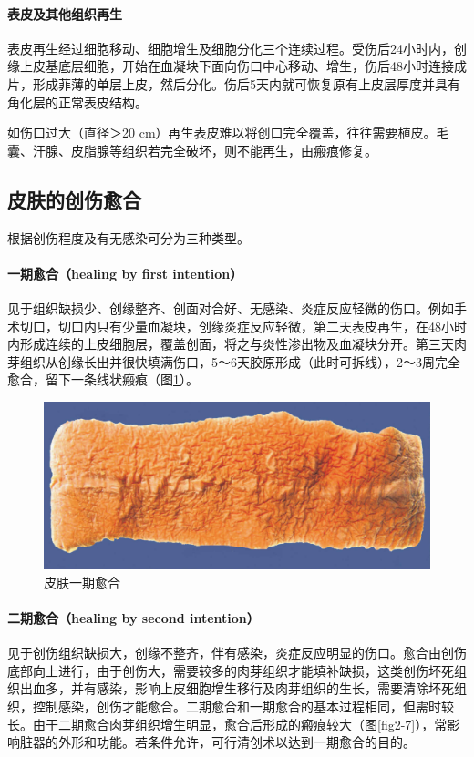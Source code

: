 \paragraph{表皮及其他组织再生}
表皮再生经过细胞移动、细胞增生及细胞分化三个连续过程。受伤后24小时内，创缘上皮基底层细胞，开始在血凝块下面向伤口中心移动、增生，伤后48小时连接成片，形成菲薄的单层上皮，然后分化。伤后5天内就可恢复原有上皮层厚度并具有角化层的正常表皮结构。

如伤口过大（直径＞20
cm）再生表皮难以将创口完全覆盖，往往需要植皮。毛囊、汗腺、皮脂腺等组织若完全破坏，则不能再生，由瘢痕修复。

\subsection{皮肤的创伤愈合}

根据创伤程度及有无感染可分为三种类型。

\paragraph{一期愈合（healing by first intention）}
见于组织缺损少、创缘整齐、创面对合好、无感染、炎症反应轻微的伤口。例如手术切口，切口内只有少量血凝块，创缘炎症反应轻微，第二天表皮再生，在48小时内形成连续的上皮细胞层，覆盖创面，将之与炎性渗出物及血凝块分开。第三天肉芽组织从创缘长出并很快填满伤口，5～6天胶原形成（此时可拆线），2～3周完全愈合，留下一条线状瘢痕（图\ref{fig2-6}）。

\begin{figure}[!htbp]
	\centering
	\includegraphics{./images/Image00029.jpg}
	\caption{皮肤一期愈合}
	\label{fig2-6}
\end{figure}

\paragraph{二期愈合（healing by second intention）}
见于创伤组织缺损大，创缘不整齐，伴有感染，炎症反应明显的伤口。愈合由创伤底部向上进行，由于创伤大，需要较多的肉芽组织才能填补缺损，这类创伤坏死组织出血多，并有感染，影响上皮细胞增生移行及肉芽组织的生长，需要清除坏死组织，控制感染，创伤才能愈合。二期愈合和一期愈合的基本过程相同，但需时较长。由于二期愈合肉芽组织增生明显，愈合后形成的瘢痕较大（图\ref{fig2-7}），常影响脏器的外形和功能。若条件允许，可行清创术以达到一期愈合的目的。

